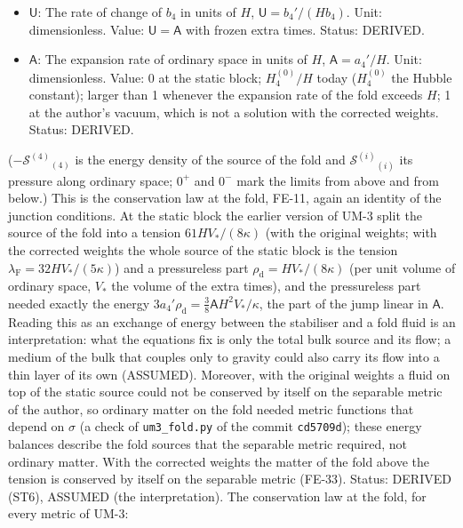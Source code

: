 \documentclass[
  10pt,
]{article}
\begin{document}
\begin{itemize}
  \(\sigma \to \mp\infty\) the tips \(z \to 0, \pi\); one period of
  \(x_0\) is the whole line \(-\infty < \sigma < \infty\). Unit: length.
  Status: DERIVED.
\item
  \(\mathsf{U}\): The rate of change of \(b_4\) in units of \(H\),
  \(\mathsf{U} = b_4'/(Hb_4)\). Unit: dimensionless. Value:
  \(\mathsf{U} = \mathsf{A}\) with frozen extra times. Status: DERIVED.
\item
  \(\mathsf{A}\): The expansion rate of ordinary space in units of
  \(H\), \(\mathsf{A} = a_4'/H\). Unit: dimensionless. Value: 0 at the
  static block; \(H_4^{(0)}/H\) today (\(H_4^{(0)}\) the Hubble
  constant); larger than 1 whenever the expansion rate of the fold
  exceeds \(H\); 1 at the author's vacuum, which is not a solution with
  the corrected weights. Status: DERIVED.
\end{itemize}

(\(-\mathcal{S}^{(4)}{}_{(4)}\) is the energy density of the source of
the fold and \(\mathcal{S}^{(i)}{}_{(i)}\) its pressure along ordinary
space; \(0^+\) and \(0^-\) mark the limits from above and from below.)
This is the conservation law at the fold, FE-11, again an identity of
the junction conditions. At the static block the earlier version of UM-3
split the source of the fold into a tension \(61HV_*/(8\kappa)\) (with
the original weights; with the corrected weights the whole source of the
static block is the tension \(\lambda_{\mathrm{F}} = 32HV_*/(5\kappa)\))
and a pressureless part \(\rho_{\mathrm{d}} = HV_*/(8\kappa)\) (per unit
volume of ordinary space, \(V_*\) the volume of the extra times), and
the pressureless part needed exactly the energy
\(3a_4'\rho_{\mathrm{d}} = \frac38\mathsf{A}H^2V_*/\kappa\), the part of
the jump linear in \(\mathsf{A}\). Reading this as an exchange of energy
between the stabiliser and a fold fluid is an interpretation: what the
equations fix is only the total bulk source and its flow; a medium of
the bulk that couples only to gravity could also carry its flow into a
thin layer of its own (ASSUMED). Moreover, with the original weights a
fluid on top of the static source could not be conserved by itself on
the separable metric of the author, so ordinary matter on the fold
needed metric functions that depend on \(\sigma\) (a check of
\texttt{um3\_fold.py} of the commit \texttt{cd5709d}); these energy
balances describe the fold sources that the separable metric required,
not ordinary matter. With the corrected weights the matter of the fold
above the tension is conserved by itself on the separable metric
(FE-33). Status: DERIVED (ST6), ASSUMED (the interpretation). The
conservation law at the fold, for every metric of UM-3:
\end{document}

